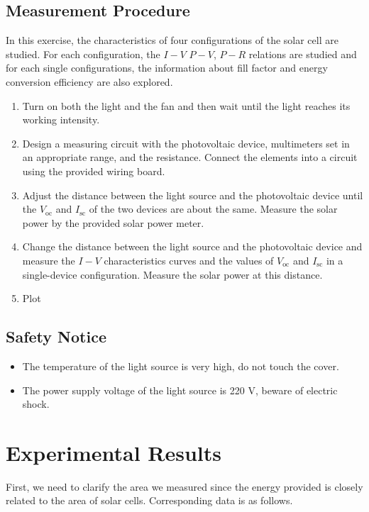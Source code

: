 \documentclass[a4paper]{article}
\begin{document}
\subsection{Measurement Procedure}

In this exercise, the characteristics of four configurations of the solar cell are studied. For each configuration, the $I-V$ $P-V$, $P-R$ relations are studied and for each single configurations, the information about fill factor and energy conversion efficiency are also explored.
\begin{enumerate}
	\item Turn on both the light and the fan and then wait until the light reaches its working intensity.
	\item Design a measuring circuit with the photovoltaic device, multimeters set in an appropriate range, and the resistance. Connect the elements into a circuit using the provided wiring board.
	\item Adjust the distance between the light source and the photovoltaic device until the $V_\text{oc}$ and $I_\text{sc}$ of the two devices are about the same. Measure the solar power by the provided solar power meter.
	\item Change the distance between the light source and the photovoltaic device and measure the $I-V$ characteristics curves and the values of $V_\text{oc}$ and $I_\text{sc}$ in a single-device configuration. Measure the solar power at this distance.
	\item Plot
\end{enumerate}

\subsection{Safety Notice}

\begin{itemize}
	\item The temperature of the light source is very high, do not touch the cover.
	\item The power supply voltage of the light source is 220 V, beware of electric shock.
\end{itemize}


\section{Experimental Results}

First, we need to clarify the area we measured since the energy provided is closely related to the area of solar cells.
Corresponding data is as follows.
\end{document}
